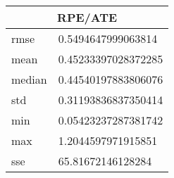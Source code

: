 \begin{table}[!ht] 
 \centering 
 \begin{tabular}{|l|l|} \hline 
 \multicolumn{2}{|c|}{RPE/ATE} \\ \hline 
 rmse & 0.5494647999063814 \\ \hline 
mean & 0.45233397028372285 \\ \hline 
median & 0.44540197883806076 \\ \hline 
std & 0.31193836837350414 \\ \hline 
min & 0.05423237287381742 \\ \hline 
max & 1.2044597971915851 \\ \hline 
sse & 65.81672146128284 \\ \hline 
\end{tabular} 
 \end{table}